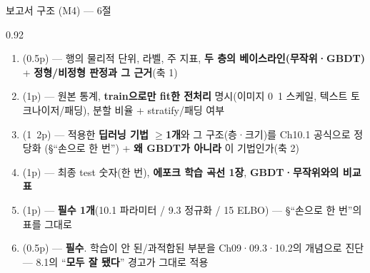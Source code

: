 \begin{frame}{보고서 구조 (M4) — 6절}
\begin{center}\begin{varwidth}{0.92\textwidth}
  
  \begin{enumerate}
    \item {}(0.5p) — 행의 물리적 단위, 라벨, 주 지표,
      \textbf{두 층의 베이스라인(무작위·GBDT)} + \textbf{정형/비정형
      판정과 그 근거}(축 1)
    \item {}(1p) — 원본 통계, \textbf{train으로만
      fit한 전처리} 명시(이미지 0~1 스케일, 텍스트 토크나이저/패딩),
      분할 비율 + stratify/패딩 여부
    \item {}(1~2p) — 적용한 \textbf{딥러닝 기법
      $\geq$1개}와 그 구조(층·크기)를 Ch10.1 공식으로 정당화
      (§``손으로 한 번'') + \textbf{왜 GBDT가 아니라} 이 기법인가(축 2)
    \item {}(1p) — 최종 test 숫자(한 번), \textbf{에포크 학습
      곡선 1장}, \textbf{GBDT·무작위와의 비교 표}
    \item {}(1p) — \textbf{필수 1개}(10.1 파라미터 /
      9.3 정규화 / 15 ELBO) — §``손으로 한 번''의 표를 그대로
    \item {}(0.5p) — \textbf{필수}.
      학습이 안 된/과적합된 부분을 Ch09·09.3·10.2의 개념으로 진단 —
      8.1의 ``\textbf{모두 잘 됐다}'' 경고가 그대로 적용
  \end{enumerate}
\end{varwidth}\end{center}
\end{frame}
